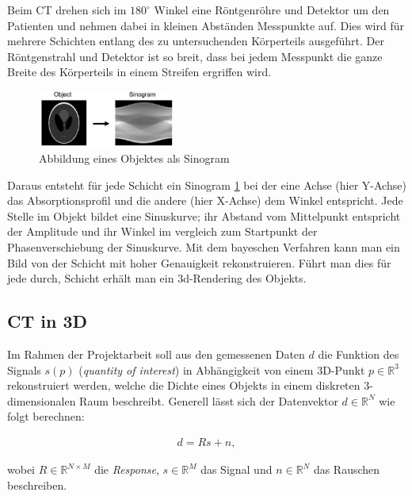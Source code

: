 Beim CT drehen sich im $180^\circ$ Winkel eine Röntgenröhre und Detektor um den Patienten und nehmen dabei in kleinen Abständen Messpunkte auf. Dies wird für mehrere Schichten entlang des zu untersuchenden Körperteils ausgeführt. Der Röntgenstrahl und Detektor ist so breit, dass bei jedem Messpunkt die ganze Breite des Körperteils in einem Streifen ergriffen wird.

\begin{figure}[htb]
 \centering
 \includegraphics[width=0.4\textwidth]{k4.2/backprojektion.png}
 \caption{Abbildung eines Objektes als Sinogram}
 \label{k4.2.tomo.ct.bp}
\end{figure}

Daraus entsteht für jede Schicht ein Sinogram \cref{k4.2.tomo.ct.bp} bei der eine Achse (hier Y-Achse) das Absorptionsprofil und die andere (hier X-Achse) dem Winkel entspricht. Jede Stelle im Objekt bildet eine Sinuskurve; ihr Abstand vom Mittelpunkt entspricht der Amplitude und ihr Winkel im vergleich zum Startpunkt der Phasenverschiebung der Sinuskurve. Mit dem bayeschen Verfahren  kann man ein Bild von der Schicht mit hoher Genauigkeit rekonstruieren. Führt man dies für jede durch, Schicht erhält man ein 3d-Rendering des Objekts.


\subsection{CT in 3D}\label{k4.2.ct.3d}

Im Rahmen der Projektarbeit soll aus den gemessenen Daten $d$ die Funktion des Signals $s(p)$ (\emph{quantity of interest}) in Abhängigkeit von einem 3D-Punkt $p \in \mathbb{R}^3$ rekonstruiert werden, welche die Dichte eines Objekts in einem diskreten 3-dimensionalen Raum beschreibt. Generell lässt sich der Datenvektor $d \in \mathbb{R}^N$ wie folgt berechnen:

\begin{equation}
  \label{k4.2.ct.3d.datamodel}
  \begin{aligned}
    d = Rs + n,
  \end{aligned}
\end{equation}

wobei $R \in \mathbb{R}^{N \times M}$ die \emph{Response}, $s \in \mathbb{R}^M$ das Signal und $n \in \mathbb{R}^N$ das Rauschen beschreiben. 

